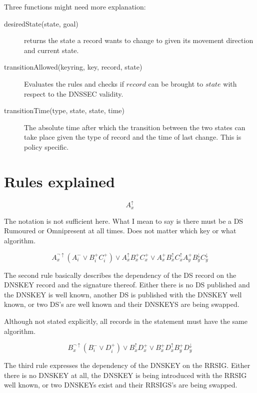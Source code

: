 \documentclass[twoside, a4paper]{article}
\begin{document}
Three functions might need more explanation:
\begin{description}
\item[desiredState(state, goal)]	returns the state a record 
wants to change to given its movement direction and current state.
\item[transitionAllowed(keyring, key, record, state)]	Evaluates the
rules and checks if $record$ can be brought to $state$ with respect
to the DNSSEC validity.
\item[transitionTime(type, state, state, time)]	The absolute time after
which the transition between the two states can take place given the 
type of record and the time of last change. This is policy specific.
\end{description}

\section{Rules explained}

\begin{equation}
A_{x}^{\uparrow} 
\end{equation}

The notation is not sufficient here. What I mean to say is there must
be a DS Rumoured or Omnipresent at all times. Does not matter which key
or what algorithm.

\begin{equation}
A_{x}^{\neg \uparrow} (A_{i}^{-} \vee B_{i}^{+} C_{i}^{+}) \vee A_{x}^{\uparrow}
	B_{x}^{+} C_{x}^{+} \vee A_{x}^{+} B_{x}^{\uparrow} C_{x}^{\uparrow}
	A_{y}^{+} B_{y}^{\downarrow} C_{y}^{\downarrow}
\end{equation}

The second rule basically describes the dependency of the DS record
on the DNSKEY record and the signature thereof. Either there is no DS
published and the DNSKEY is well known, another DS is published with the
DNSKEY well known, or two DS's are well known and their DNSKEYS are being 
swapped.

Although not stated explicitly, all records in the statement must have
the same algorithm.

\begin{equation}
B_{x}^{\neg \uparrow} (B_{i}^{-} \vee D_{i}^{+}) \vee B_{x}^{\uparrow}
	D_{x}^{+} \vee B_{x}^{+} D_{x}^{\uparrow} B_{y}^{+}
	D_{y}^{\downarrow}
\end{equation}

The third rule expresses the dependency of the DNSKEY on the RRSIG. 
Either there is no DNSKEY at all, the DNSKEY is being introduced with
the RRSIG well known, or two DNSKEYs exist and their RRSIGS's are being
swapped.
\end{document}
